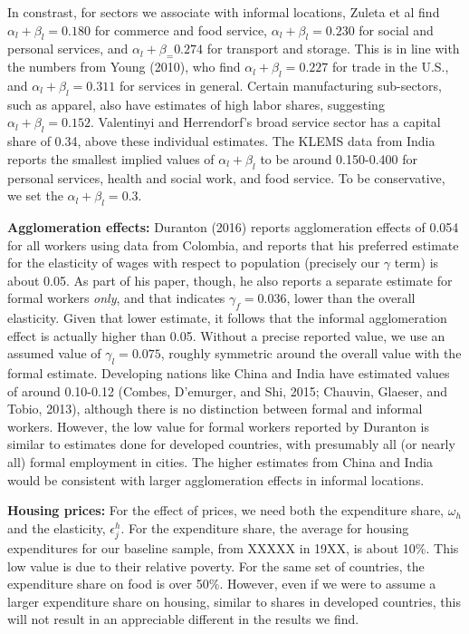 \documentclass[10pt]{article}
\begin{document}
In constrast, for sectors we associate with informal locations, Zuleta et al find $\alpha_l + \beta_l = 0.180$ for commerce and food service, $\alpha_l + \beta_l = 0.230$ for social and personal services, and $\alpha_l + \beta_ = 0.274$ for transport and storage. This is in line with the numbers from Young (2010), who find $\alpha_l + \beta_l = 0.227$ for trade in the U.S., and $\alpha_l + \beta_l = 0.311$ for services in general. Certain manufacturing sub-sectors, such as apparel, also have estimates of high labor shares, suggesting $\alpha_l + \beta_l = 0.152$. Valentinyi and Herrendorf's broad service sector has a capital share of 0.34, above these individual estimates. The KLEMS data from India reports the smallest implied values of $\alpha_l+\beta_l$ to be around 0.150-0.400 for personal services, health and social work, and food service. To be conservative, we set the $\alpha_l + \beta_l = 0.3$.

\textbf{Agglomeration effects:} Duranton (2016) reports agglomeration effects of 0.054 for all workers using data from Colombia, and reports that his preferred estimate for the elasticity of wages with respect to population (precisely our $\gamma$ term) is about 0.05. As part of his paper, though, he also reports a separate estimate for formal workers \textit{only}, and that indicates $\gamma_f = 0.036$, lower than the overall elasticity. Given that lower estimate, it follows that the informal agglomeration effect is actually higher than 0.05. Without a precise reported value, we use an assumed value of $\gamma_l = 0.075$, roughly symmetric around the overall value with the formal estimate. Developing nations like China and India have estimated values of around 0.10-0.12 (Combes, D'emurger, and Shi, 2015; Chauvin, Glaeser, and Tobio, 2013), although there is no distinction between formal and informal workers. However, the low value for formal workers reported by Duranton is similar to estimates done for developed countries, with presumably all (or nearly all) formal employment in cities. The higher estimates from China and India would be consistent with larger agglomeration effects in informal locations.

\textbf{Housing prices:} For the effect of prices, we need both the expenditure share, $\omega_h$ and the elasticity, $\epsilon^h_j$. For the expenditure share, the average for housing expenditures for our baseline sample, from XXXXX in 19XX, is about 10\%. This low value is due to their relative poverty. For the same set of countries, the expenditure share on food is over 50\%. However, even if we were to assume a larger expenditure share on housing, similar to shares in developed countries, this will not result in an appreciable different in the results we find.
\end{document}
